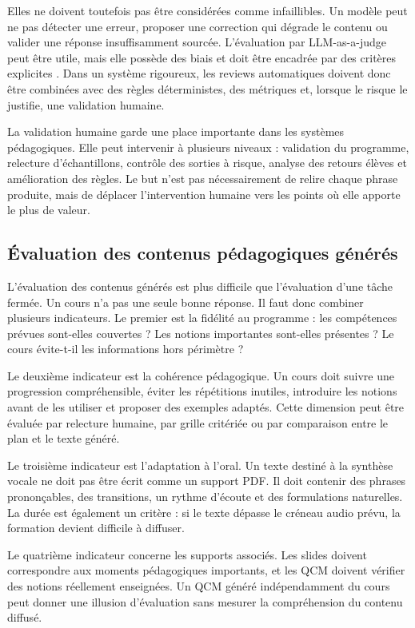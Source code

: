 \documentclass[12pt,a4paper]{article}
\begin{document}
Elles ne doivent toutefois pas être considérées comme infaillibles. Un modèle peut ne pas
détecter une erreur, proposer une correction qui dégrade le contenu ou valider une
réponse insuffisamment sourcée. L'évaluation par LLM-as-a-judge peut être utile, mais
elle possède des biais et doit être encadrée par des critères explicites \cite{zheng2023judging}.
Dans un système rigoureux, les reviews automatiques doivent donc être combinées avec
des règles déterministes, des métriques et, lorsque le risque le justifie, une validation
humaine.

La validation humaine garde une place importante dans les systèmes pédagogiques. Elle
peut intervenir à plusieurs niveaux : validation du programme, relecture d'échantillons,
contrôle des sorties à risque, analyse des retours élèves et amélioration des règles. Le
but n'est pas nécessairement de relire chaque phrase produite, mais de déplacer
l'intervention humaine vers les points où elle apporte le plus de valeur.

\subsection{Évaluation des contenus pédagogiques générés}

L'évaluation des contenus générés est plus difficile que l'évaluation d'une tâche fermée.
Un cours n'a pas une seule bonne réponse. Il faut donc combiner plusieurs indicateurs.
Le premier est la fidélité au programme : les compétences prévues sont-elles couvertes ?
Les notions importantes sont-elles présentes ? Le cours évite-t-il les informations hors
périmètre ?

Le deuxième indicateur est la cohérence pédagogique. Un cours doit suivre une progression
compréhensible, éviter les répétitions inutiles, introduire les notions avant de les utiliser
et proposer des exemples adaptés. Cette dimension peut être évaluée par relecture humaine,
par grille critériée ou par comparaison entre le plan et le texte généré.

Le troisième indicateur est l'adaptation à l'oral. Un texte destiné à la synthèse vocale ne
doit pas être écrit comme un support PDF. Il doit contenir des phrases prononçables, des
transitions, un rythme d'écoute et des formulations naturelles. La durée est également
un critère : si le texte dépasse le créneau audio prévu, la formation devient difficile à
diffuser.

Le quatrième indicateur concerne les supports associés. Les slides doivent correspondre
aux moments pédagogiques importants, et les QCM doivent vérifier des notions réellement
enseignées. Un QCM généré indépendamment du cours peut donner une illusion
d'évaluation sans mesurer la compréhension du contenu diffusé.
\end{document}
